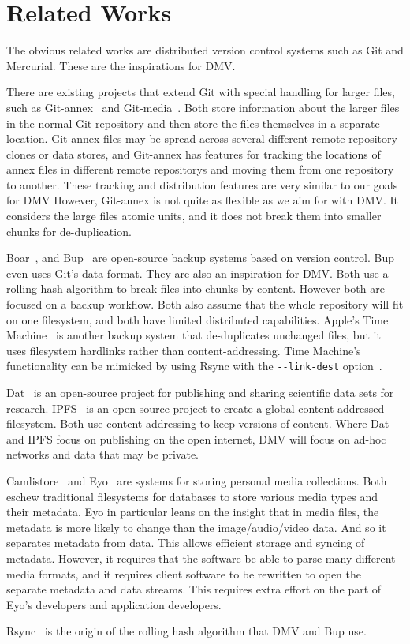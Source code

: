 \section{Related Works}

The obvious related works are distributed version control systems such as Git and Mercurial.
These are the inspirations for DMV.

There are existing projects that extend Git with special handling for larger files, such as Git-annex~\cite{git_annex_homepage} and Git-media~\cite{git_media_github}.
Both store information about the larger files in the normal Git \gls{repository} and then store the files themselves in a separate location.
Git-annex files may be spread across several different remote \gls{repository} clones or data stores, and Git-annex has features for tracking the locations of annex files in different remote \glspl{repository} and moving them from one \gls{repository} to another.
These tracking and distribution features are very similar to our goals for DMV
However, Git-annex is not quite as flexible as we aim for with \gls{DMV}.
It considers the large files atomic units, and it does not break them into smaller chunks for de-duplication.

Boar~\cite{boar_homepage}, and Bup~\cite{bup_homepage} are open-source backup systems based on version control.
Bup even uses Git's data format.
They are also an inspiration for DMV.
Both use a rolling hash algorithm to break files into chunks by content.
However both are focused on a backup workflow.
Both also assume that the whole repository will fit on one filesystem, and both have limited distributed capabilities.
Apple's Time Machine~\cite{timemachine_patent} is another backup system that de-duplicates unchanged files, but it uses filesystem hardlinks rather than content-addressing.
Time Machine's functionality can be mimicked by using Rsync with the \lstinline{--link-dest} option~\cite{timemachine_foreveryunix}.

Dat~\cite{dat_homepage} is an open-source project for publishing and sharing scientific data sets for research.
IPFS~\cite{ipfs_github_main} is an open-source pro\-ject to create a global content-addressed filesystem.
Both use content addressing to keep versions of content.
Where Dat and IPFS focus on publishing on the open internet, DMV will focus on ad-hoc networks and data that may be private.

Camlistore~\cite{camlistore_homepage} and Eyo~\cite{Strauss:2011:EDP:2002181.2002216} are systems for storing personal media collections.
Both eschew traditional filesystems for databases to store various media types and their metadata.
Eyo in particular leans on the insight that in media files, the metadata is more likely to change than the image/audio/video data.
And so it separates metadata from data.
This allows efficient storage and syncing of metadata.
However, it requires that the software be able to parse many different media formats, and it requires client software to be rewritten to open the separate metadata and data streams.
This requires extra effort on the part of Eyo's developers and application developers.

Rsync~\cite{rsynctechreport} is the origin of the rolling hash algorithm that DMV and Bup use.

